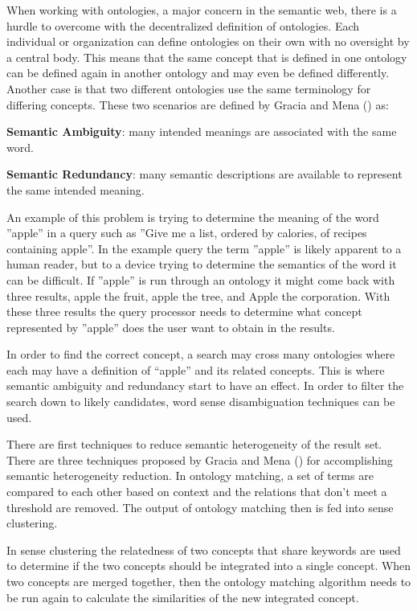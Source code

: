 \documentclass[10pt,journal,compsoc]{IEEEtran}
\begin{document}
When working with ontologies, a major concern in the semantic web, there is a hurdle to overcome with the decentralized definition of ontologies. Each individual or organization can define ontologies on their own with no oversight by a central body. This means that the same concept that is defined in one ontology can be defined again in another ontology and may even be defined differently. Another case is that two different ontologies use the same terminology for differing concepts. These two scenarios are defined by Gracia and Mena (\cite{gracia_dealing_2011}) as:
\begin{center} \textbf{Semantic Ambiguity}: many intended meanings are associated with the same word.\end{center}
\begin{center} \textbf{Semantic Redundancy}: many semantic descriptions are available to represent the same intended meaning.\end{center}

An example of this problem is trying to determine the meaning of the word ''apple'' in a query such as ''Give me a list, ordered by calories, of recipes containing apple''. In the example query the term ''apple'' is likely apparent to a human reader, but to a device trying to determine the semantics of the word it can be difficult. If ''apple'' is run through an ontology it might come back with three results, apple the fruit, apple the tree, and Apple the corporation. With these three results the query processor needs to determine what concept represented by ''apple'' does the user want to obtain in the results.

In order to find the correct concept, a search may cross many ontologies where each may have a definition of “apple” and its related concepts. This is where semantic ambiguity and redundancy start to have an effect. In order to filter the search down to likely candidates, word sense disambiguation techniques can be used.

There are first techniques to reduce semantic heterogeneity of the result set. There are three techniques proposed by Gracia and Mena (\cite{gracia_dealing_2011}) for accomplishing semantic heterogeneity reduction. In ontology matching, a set of terms are compared to each other based on context and the relations that don't meet a threshold are removed. The output of ontology matching then is fed into sense clustering. 

In sense clustering the relatedness of two concepts that share keywords are used to determine if the two concepts should be integrated into a single concept. When two concepts are merged together, then the ontology matching algorithm needs to be run again to calculate the similarities of the new integrated concept.
\end{document}
